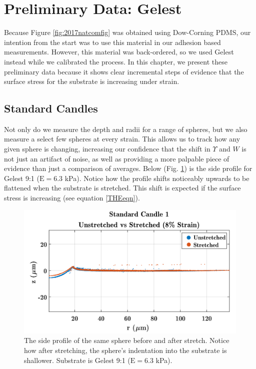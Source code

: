 \section{Preliminary Data: Gelest}
Because Figure \ref{fig:2017natcomfig} was obtained using Dow-Corning PDMS, our intention from the start was to use this material in our adhesion based measurements. However, this material was back-ordered, so we used Gelest instead while we calibrated the process. In this chapter, we present these preliminary data because it shows clear incremental steps of evidence that the surface stress for the substrate is increasing under strain.  

\subsection{Standard Candles}
Not only do we measure the depth and radii for a range of spheres, but we also measure a select few spheres at every strain. This allows us to track how any given sphere is changing, increasing our confidence that the shift in $\Upsilon$ and $ W $ is not just an artifact of noise, as well as providing a more palpable piece of evidence than just a comparison of averages. Below (Fig. \ref{fig:sc1unstretchedv8ml}) is the side profile for Gelest 9:1 ($\text{E}=6.3$ kPa). Notice how the profile shifts noticeably upwards to be flattened when the substrate is stretched. This shift is expected if the surface stress is increasing (see equation \ref{THEeqn}).

\begin{figure}[h!]
	\centering
	\includegraphics[width=\linewidth]{Chapters/Figures/sc1_unstretched_v_8ml}
	\caption[Side Collapse Comparison]{The side profile of the same sphere before and after stretch. Notice how after stretching, the sphere's indentation into the substrate is shallower. Substrate is Gelest 9:1 ($\text{E}=6.3$ kPa).}	
	\label{fig:sc1unstretchedv8ml}
\end{figure}

